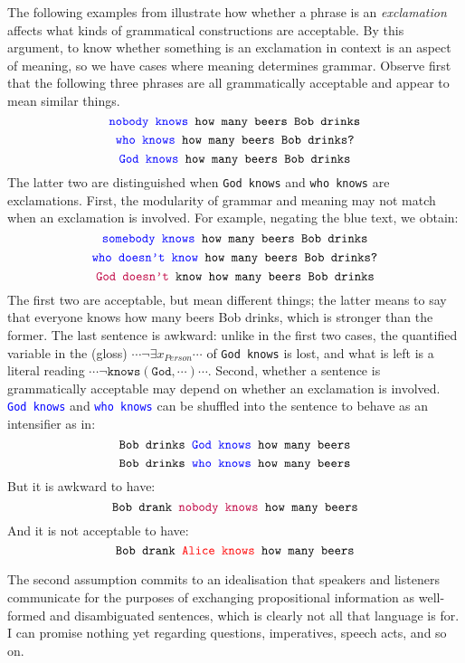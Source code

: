\begin{example}
The following examples from \citep{linuspaulingmemoriallectureseriesNeuroscienceLanguageThought2018} illustrate how whether a phrase is an \emph{exclamation} affects what kinds of grammatical constructions are acceptable. By this argument, to know whether something is an exclamation in context is an aspect of meaning, so we have cases where meaning determines grammar. Observe first that the following three phrases are all grammatically acceptable and appear to mean similar things.
\[\texttt{\textcolor{blue}{nobody knows} how many beers Bob drinks}\]
\[\texttt{\textcolor{blue}{who knows} how many beers Bob drinks?}\]
\[\texttt{\textcolor{blue}{God knows} how many beers Bob drinks}\]
The latter two are distinguished when \texttt{God knows} and \texttt{who knows} are exclamations. First, the modularity of grammar and meaning may not match when an exclamation is involved. For example, negating the blue text, we obtain:
\[\texttt{\textcolor{blue}{somebody knows} how many beers Bob drinks}\]
\[\texttt{\textcolor{blue}{who doesn't know} how many beers Bob drinks?}\]
\[\texttt{\textcolor{purple}{God doesn't} know how many beers Bob drinks}\]
The first two are acceptable, but mean different things; the latter means to say that everyone knows how many beers Bob drinks, which is stronger than the former. The last sentence is awkward: unlike in the first two cases, the quantified variable in the (gloss) $\cdots \neg \exists x_{Person} \cdots$ of \texttt{God knows} is lost, and what is left is a literal reading $\cdots \neg \texttt{knows}(\texttt{God},\cdots) \cdots$.
Second, whether a sentence is grammatically acceptable may depend on whether an exclamation is involved. \texttt{\textcolor{blue}{God knows}} and \texttt{\textcolor{blue}{who knows}} can be shuffled into the sentence to behave as an intensifier as in:
\[\texttt{Bob drinks \textcolor{blue}{God knows} how many beers}\]
\[\texttt{Bob drinks \textcolor{blue}{who knows} how many beers}\]
But it is awkward to have:
\[\texttt{Bob drank \textcolor{purple}{nobody knows} how many beers}\]
And it is not acceptable to have:
\[\texttt{Bob drank \textcolor{red}{Alice knows} how many beers}\]
\end{example}


The second assumption commits to an idealisation that speakers and listeners communicate for the purposes of exchanging propositional information as well-formed and disambiguated sentences, which is clearly not all that language is for. I can promise nothing yet regarding questions, imperatives, speech acts, and so on.

